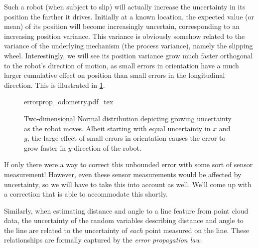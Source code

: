 Such a robot (when subject to slip) will actually increase the uncertainty in its position the farther it drives. Initially at a known location, the expected value (or mean) of its position will become increasingly uncertain, corresponding to an increasing position variance. This variance is obviously somehow related to the variance of the underlying mechanism (the process variance), namely the slipping wheel. Interestingly, we will see its position variance grow much faster orthogonal to the robot's direction of motion, as small errors in orientation have a much larger cumulative effect on position than small errors in the longitudinal direction. This is illustrated in \cref{fig:errorprop_odometry}.

\begin{figure}
	\centering
    \def\svgwidth{\textwidth}
    {errorprop_odometry.pdf_tex}
	\caption{Two-dimensional Normal distribution depicting growing uncertainty as the robot moves. Albeit starting with equal
    uncertainty in $x$ and $y$, the large effect of small errors in orientation causes the error to grow faster in $y$-direction of the robot.}
	\label{fig:errorprop_odometry}
\end{figure}

If only there were a way to correct this unbounded error with some sort of sensor measurement! However, even these sensor measurements would be affected by uncertainty, so we will have to take this into account as well. We'll come up with a correction that is able to accommodate this shortly.

Similarly, when estimating distance and angle to a line feature from point cloud data, the uncertainty of the random variables describing distance and angle to the line are related to the uncertainty of \textsl{each} point measured on the line. These relationships are formally captured by the \textsl{error propagation law}.

